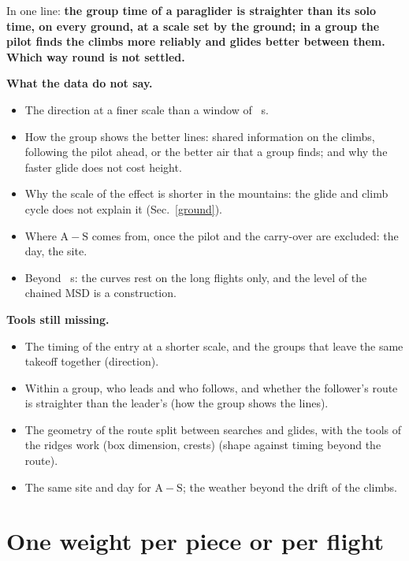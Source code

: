 \documentclass[10pt,a4paper]{article}
\newcommand{\A}{\mathrm{A}}
\newcommand{\Sl}{\mathrm{S}}
\newcommand{\Com}{\item[\textcolor{black}{\textbf{Comment.}}]\color{black}}
\newenvironment{step}{\begin{description}[leftmargin=0pt, itemsep=7pt, topsep=8pt]}{\end{description}}
\begin{document}
\begin{step}
  In one line: \textbf{the group time of a paraglider is straighter than its solo time, on every ground, at a scale
  set by the ground; in a group the pilot finds the climbs more reliably and glides better between them. Which way
  round is not settled.}
\Com \textbf{What the data do not say.}
  \begin{itemize}
  \item The direction at a finer scale than a window of \WhenWindow~s.
  \item How the group shows the better lines: shared information on the climbs, following the pilot ahead, or the
    better air that a group finds; and why the faster glide does not cost height.
  \item Why the scale of the effect is shorter in the mountains: the glide and climb cycle does not explain it
    (Sec.~\ref{ground}).
  \item Where $\A-\Sl$ comes from, once the pilot and the carry-over are excluded: the day, the site.
  \item Beyond \ChainSolidEnd~s: the curves rest on the long flights only, and the level of the chained MSD is a
    construction.
  \end{itemize}
\Com \textbf{Tools still missing.}
  \begin{itemize}
  \item The timing of the entry at a shorter scale, and the groups that leave the same takeoff together (direction).
  \item Within a group, who leads and who follows, and whether the follower's route is straighter than the
    leader's (how the group shows the lines).
  \item The geometry of the route split between searches and glides, with the tools of the ridges work (box
    dimension, crests) (shape against timing beyond the route).
  \item The same site and day for $\A-\Sl$; the weather beyond the drift of the climbs.
  \end{itemize}
\end{step}

\appendix
\section{One weight per piece or per flight}\label{app:weights}
\end{document}
